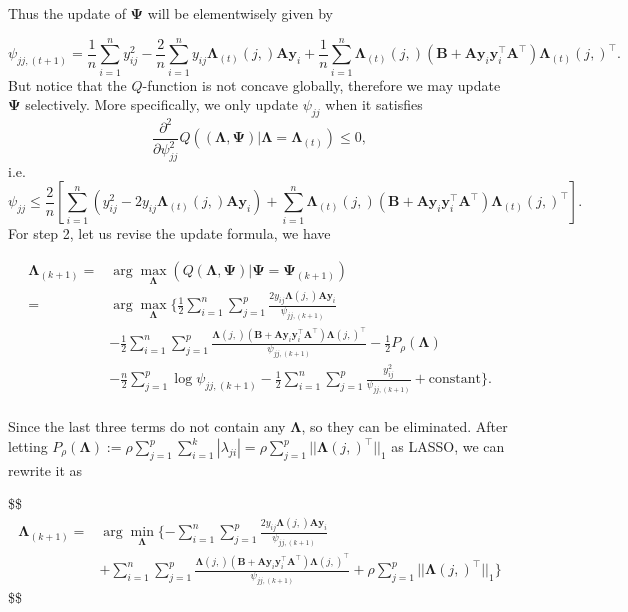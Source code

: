 \documentclass[
  a4paper,
  oneside,
  openany,
  12pt,
  onecolumn,
  twoside]{book}
\theoremstyle{plain}
\theoremstyle{remark}
\begin{document}
Thus the update of \(\boldsymbol{\Psi}\) will be elementwisely given by

\[
\begin{equation}
\psi_{jj,(t+1)}=\frac{1}{n}\sum_{i=1}^n y_{ij}^2-\frac{2}{n}\sum_{i=1}^ny_{ij}\boldsymbol{\Lambda}_{(t)}(j,)\boldsymbol{A}\boldsymbol{y}_i + \frac{1}{n}\sum_{i=1}^n \boldsymbol{\Lambda}_{(t)}(j,)(\boldsymbol{B}+\boldsymbol{A}\boldsymbol{y}_i\boldsymbol{y}_i^\top\boldsymbol{A}^\top)\boldsymbol{\Lambda}_{(t)}(j,)^\top.
\end{equation}
\] But notice that the \(Q\)-function is not concave globally, therefore
we may update \(\boldsymbol{\Psi}\) selectively. More specifically, we
only update \(\psi_{jj}\) when it satisfies \[
\frac{\partial^2}{\partial\psi_{jj}^2}Q((\boldsymbol{\Lambda},\boldsymbol{\Psi})|\boldsymbol{\Lambda}=\boldsymbol{\Lambda}_{(t)})\leq 0,
\] i.e. \[
\psi_{jj}\leq \frac{2}{n}[\sum_{i=1}^n(y_{ij}^2-2y_{ij}\boldsymbol{\Lambda}_{(t)}(j,)\boldsymbol{A}\boldsymbol{y}_i)+\sum_{i=1}^n\boldsymbol{\Lambda}_{(t)}(j,)(\boldsymbol{B}+\boldsymbol{A}\boldsymbol{y}_i\boldsymbol{y}_i^\top\boldsymbol{A}^\top)\boldsymbol{\Lambda}_{(t)}(j,)^\top].
\] For step 2, let us revise the update formula, we have

\[
\begin{align*}
\boldsymbol{\Lambda}_{(k+1)}=&\arg \max_{\boldsymbol{\Lambda}} (Q(\boldsymbol{\Lambda,\boldsymbol{\Psi}})|\boldsymbol{\Psi}=\boldsymbol{\Psi}_{(k+1)})\\
=&\arg \max_{\boldsymbol{\Lambda}} \{\frac{1}{2} \sum_{i=1}^n \sum_{j=1}^p \frac{2y_{ij}\boldsymbol{\Lambda}(j,)\boldsymbol{A}\boldsymbol{y}_i}{\psi_{jj,(k+1)}}\\
&-\frac{1}{2}\sum_{i=1}^n\sum_{j=1}^p\frac{\boldsymbol{\Lambda}(j,)(\boldsymbol{B}+\boldsymbol{A}\boldsymbol{y}_i\boldsymbol{y}_i^\top\boldsymbol{A}^\top)\boldsymbol{\Lambda}(j,)^\top}{\psi_{jj,(k+1)}}-\frac{1}{2}P_{\rho}(\boldsymbol{\Lambda})\\
&-\frac{n}{2}\sum_{j=1}^p\log{\psi_{jj,(k+1)}}-\frac{1}{2}\sum_{i=1}^n\sum_{j=1}^p\frac{y_{ij}^2}{\psi_{jj,(k+1)}}+\text{constant}\}.\\
\end{align*}
\]

Since the last three terms do not contain any \(\boldsymbol{\Lambda}\),
so they can be eliminated. After letting
\(P_\rho(\boldsymbol{\Lambda}):=\rho\sum_{j=1}^p\sum_{i=1}^k|\lambda_{ji}|=\rho \sum_{j=1}^p||\boldsymbol{\Lambda}(j,)^\top||_1\)
as LASSO, we can rewrite it as

\$\$ \begin{align*}
\boldsymbol{\Lambda}_{(k+1)}

=& \arg \min_{\boldsymbol{\Lambda}}\{-\sum_{i=1}^n \sum_{j=1}^p \frac{2y_{ij}\boldsymbol{\Lambda}(j,)\boldsymbol{A}\boldsymbol{y}_i}{\psi_{jj,(k+1)}}\\

& + \sum_{i=1}^n\sum_{j=1}^p\frac{\boldsymbol{\Lambda}(j,)(\boldsymbol{B}+\boldsymbol{A}\boldsymbol{y}_i\boldsymbol{y}_i^\top\boldsymbol{A}^\top)\boldsymbol{\Lambda}(j,)^\top}{\psi_{jj,(k+1)}} + \rho \sum_{j=1}^p||\boldsymbol{\Lambda}(j,)^\top||_1
  \}
\end{align*} \$\$
\end{document}
